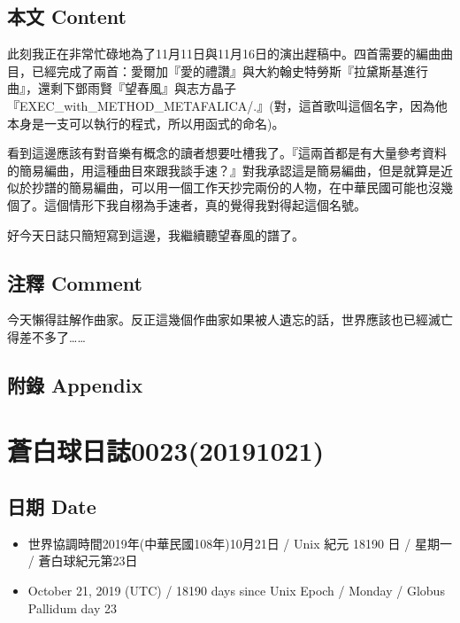 \documentclass[a5paper, 12pt
]{book}
\providecommand{\tightlist}{%
  \setlength{\itemsep}{0pt}\setlength{\parskip}{0pt}}
\begin{document}
\hypertarget{ux672cux6587-content-21}{%
\subsection{本文 Content}\label{ux672cux6587-content-21}}

此刻我正在非常忙碌地為了11月11日與11月16日的演出趕稿中。四首需要的編曲曲目，已經完成了兩首：愛爾加『愛的禮讚』與大約翰史特勞斯『拉黛斯基進行曲』，還剩下鄧雨賢『望春風』與志方晶子『EXEC\_with\_METHOD\_METAFALICA/.』(對，這首歌叫這個名字，因為他本身是一支可以執行的程式，所以用函式的命名)。

看到這邊應該有對音樂有概念的讀者想要吐槽我了。『這兩首都是有大量參考資料的簡易編曲，用這種曲目來跟我談手速？』對我承認這是簡易編曲，但是就算是近似於抄譜的簡易編曲，可以用一個工作天抄完兩份的人物，在中華民國可能也沒幾個了。這個情形下我自栩為手速者，真的覺得我對得起這個名號。

好今天日誌只簡短寫到這邊，我繼續聽望春風的譜了。

\hypertarget{ux6ce8ux91cb-comment-15}{%
\subsection{注釋 Comment}\label{ux6ce8ux91cb-comment-15}}

今天懶得註解作曲家。反正這幾個作曲家如果被人遺忘的話，世界應該也已經滅亡得差不多了\ldots\ldots{}

\hypertarget{ux9644ux9304-appendix-14}{%
\subsection{附錄 Appendix}\label{ux9644ux9304-appendix-14}}

\hypertarget{ux84bcux767dux7403ux65e5ux8a8c002320191021}{%
\section{蒼白球日誌0023(20191021)}\label{ux84bcux767dux7403ux65e5ux8a8c002320191021}}

\hypertarget{ux65e5ux671f-date-22}{%
\subsection{日期 Date}\label{ux65e5ux671f-date-22}}

\begin{itemize}
\tightlist
\item
  世界協調時間2019年(中華民國108年)10月21日 / Unix 紀元 18190 日 /
  星期一 / 蒼白球紀元第23日
\item
  October 21, 2019 (UTC) / 18190 days since Unix Epoch / Monday / Globus
  Pallidum day 23
\end{itemize}
\end{document}
